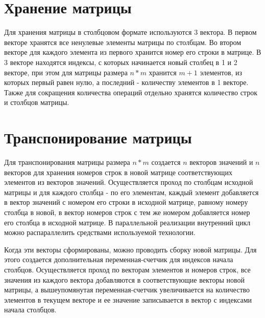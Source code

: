 \documentclass{report}
\begin{document}
\newpage

\section*{Хранение матрицы}
\par Для хранения матрицы в столбцовом формате используются 3 вектора. В первом векторе хранятся все ненулевые элементы матрицы по столбцам. Во втором векторе для каждого элемента из первого хранится номер его строки в матрице. В 3 векторе находятся индексы, с которых начинается новый столбец в 1 и 2 векторе, при этом для матрицы размера \(n*m\) хранится \(m+1\) элементов, из которых первый равен нулю, а последний - количеству элементов в 1 векторе. Также для сокращения количества операций отдельно хранятся количество строк и столбцов матрицы.

\newpage

\section*{Транспонирование матрицы}
\par Для транспонирования матрицы размера \(n*m\) создается \(n\) векторов значений и \(n\) векторов для хранения номеров строк в новой матрице соответствующих элементов из векторов значений. Осуществляется проход по столбцам исходной матрицы и для каждого столбца - по его элементам, каждый элемент добавляется в вектор значений с номером его строки в исходной матрице, равному номеру столбца в новой, в вектор номеров строк с тем же номером добавляется номер его столбца в исходной матрице. В параллельной реализации внутренний цикл можно распараллелить средствами используемой технологии.

\par Когда эти векторы сформированы, можно проводить сборку новой матрицы. Для этого создается дополнительная переменная-счетчик для индексов начала столбцов. Осуществляется проход по векторам элементов и номеров строк, все значения из каждого вектора добавляются в соответствующие векторы новой матрицы, а вышеупомянутая переменная-счетчик увеличивается на количество элементов в текущем векторе и ее значение записывается в вектор с индексами начала столбцов.

\newpage
\end{document}
